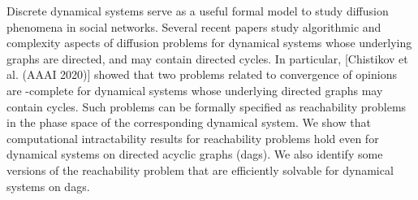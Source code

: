 Discrete dynamical systems serve as a
useful formal model to study diffusion phenomena in social networks.
Several recent papers study algorithmic and complexity aspects of
diffusion problems for dynamical systems whose underlying graphs
are directed, and may contain directed cycles.  In particular,
[Chistikov et al. (AAAI 2020)] showed that two problems related to
convergence of opinions are \cpsp-complete
for dynamical systems whose underlying directed graphs
may contain cycles. Such problems can be formally specified as
reachability problems in the phase space of the corresponding
dynamical system. We show that computational intractability
results for reachability problems hold even for dynamical systems
on directed acyclic graphs (dags). We also identify some versions
of the reachability problem that are efficiently solvable for
dynamical systems on dags.
